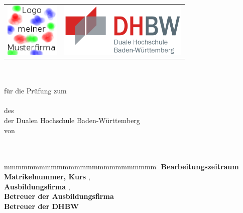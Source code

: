 \begin{titlepage}
	\begin{longtable}{p{} p{}}
	  {\includegraphics[height=2.6cm]{images/logo.png}} & 
	  {\includegraphics[height=2.6cm]{images/dhbw.png}}
	\end{longtable}
	\enlargethispage{20mm}
	\begin{center}
	  \vspace*{12mm}	{\LARGE\bf \titel }\\
	  \vspace*{12mm}	{\large\bf \arbeit}\\
	  \vspace*{12mm}	für die Prüfung zum\\
	  \vspace*{3mm} 	{\bf \abschluss}\\
	  \vspace*{12mm}	des \studiengang\\
	  \vspace*{3mm} 	der Dualen Hochschule Baden-Württemberg \dhbw\\
	  \vspace*{12mm}	von\\
	  \vspace*{3mm} 	{\large\bf \autor}\\
	  \vspace*{12mm}	\datumAbgabe\\
	\end{center}
	\vfill
	\begin{spacing}{1.2}
	\begin{tabbing}
		mmmmmmmmmmmmmmmmmmmmmmmmmm                \= \kill
		\textbf{Bearbeitungszeitraum}             \>  \zeitraum\\
		\textbf{Matrikelnummer, Kurs}             \>  \martrikelnr, \kurs\\
		\textbf{Ausbildungsfirma}                 \>  \firma, \firmenort\\
		\textbf{Betreuer der Ausbildungsfirma}    \>  \betreuer\\
		\textbf{Betreuer der DHBW}                \>  \betreuerDHBW
	\end{tabbing}
	\end{spacing}
\end{titlepage}
